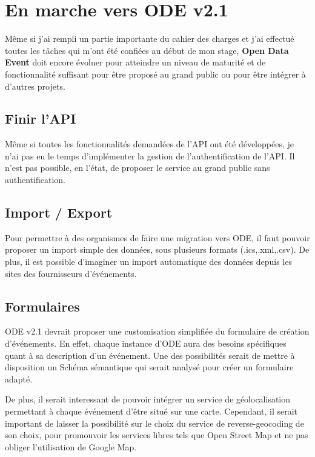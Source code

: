 \section{En marche vers ODE v2.1}

Même si j'ai rempli un partie importante du cahier des charges et j'ai effectué toutes les tâches qui m'ont été confiées au début de mon stage, \textbf{Open Data Event} doit encore évoluer pour atteindre un niveau de maturité et de fonctionnalité suffisant pour être proposé au grand public ou pour être intégrer à d'autres projets.

\subsection{Finir l'API}

Même si toutes les fonctionnalités demandées de l'API ont été développées, je n'ai pas eu le temps d'implémenter la gestion de l'authentification de l'API. Il n'est pas possible, en l'état, de proposer le service au grand public sans authentification.

\subsection{Import / Export}

Pour permettre à des organismes de faire une migration vers ODE, il faut pouvoir proposer un import simple des données, sous plusieurs formats (.ics,.xml,.csv). De plus, il est possible d'imaginer un import automatique des données depuis les sites des fournisseurs d'événements.

\subsection{Formulaires}

ODE v2.1 devrait proposer une customisation simplifiée du formulaire de création d'événements. En effet, chaque instance d'ODE aura des besoins spécifiques quant à sa description d'un événement.
Une des possibilités serait de mettre à disposition un Schéma sémantique qui serait analysé pour créer un formulaire adapté.

De plus, il serait interessant de pouvoir intégrer un service de géolocalisation permettant à chaque événement d'être situé sur une carte. Cependant, il serait important de laisser la possibilité sur le choix du service de reverse-geocoding de son choix, pour promouvoir les services libres tels que Open Street Map et ne pas obliger l'utilisation de Google Map.

